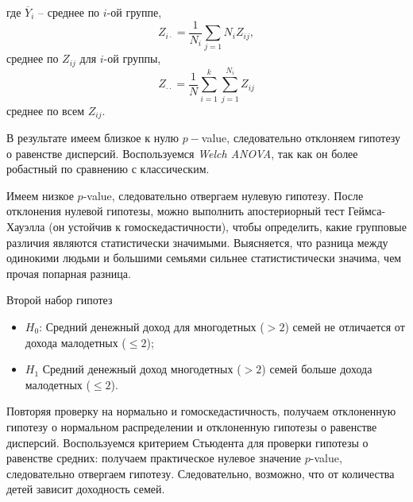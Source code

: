 \documentclass[12pt]{report}
\begin{document}
где $\overline{Y}_i$ -- среднее по $i$-ой группе,
\[
    Z_{i\cdot} = \dfrac{1}{N_i}\sum\limits_{j=1}{N_i} Z_{ij},
\]
среднее по $Z_{ij}$ для $i$-ой группы,
\[
    Z_{\cdot\cdot} = \dfrac{1}{N}\sum\limits_{i=1}^k\sum\limits_{j=1}^{N_i} Z_{ij}
\]
среднее по всем $Z_{ij}$.
\par
В результате имеем близкое к нулю $p-$value, следовательно отклоняем гипотезу о равенстве дисперсий. Воспользуемся \emph{Welch ANOVA}, так как он более робастный по сравнению с классическим. 
\par
Имеем низкое $p$-value, следовательно отвергаем нулевую гипотезу. После отклонения нулевой гипотезы, можно выполнить апостериорный тест Геймса-Хауэлла (он устойчив к гомоскедастичности), чтобы определить, какие групповые различия являются статистически значимыми. Выясняется, что разница между одинокими людьми и большими семьями сильнее статистистически значима, чем прочая попарная разница.
\par
Второй набор гипотез
\begin{itemize}
  \item $H_0$: Средний денежный доход для многодетных ($>2$) семей не отличается от дохода малодетных ($\leq 2$);
  \item $H_1$ Средний денежный доход многодетных ($>2$) семей больше дохода малодетных ($\leq 2$).
\end{itemize}
Повторяя проверку на нормально и гомоскедастичность, получаем отклоненную гипотезу о нормальном распределении и отклоненную гипотезы о равенстве дисперсий. Воспользуемся критерием Стьюдента для проверки гипотезы о равенстве средних:
получаем практическое нулевое значение $p$-value, следовательно отвергаем гипотезу. Следовательно, возможно, что от количества детей зависит доходность семей.
\end{document}
